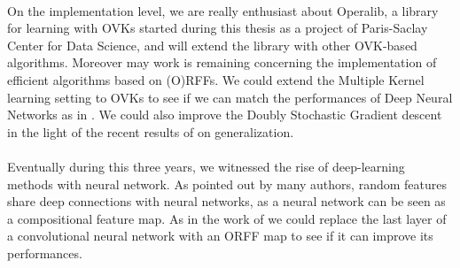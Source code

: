 \paragraph{}
On the implementation level, we are really enthusiast about Operalib, a
library for learning with \aclp{OVK} started during this thesis as a project of
Paris-Saclay Center for Data Science, and will extend the library with other
\acs{OVK}-based algorithms. Moreover may work is remaining concerning the
implementation of efficient algorithms based on (O)\acsp{RFF}. We could extend
the Multiple Kernel learning setting to \acsp{OVK} to see if we can match the
performances of Deep Neural Networks as in \citet{lu2014scale}.
We could also improve the Doubly Stochastic Gradient descent in the light of
the recent results of \citet{rudi2016generalization} on generalization.
\paragraph{}
Eventually during this three years, we witnessed the rise of deep-learning
methods with neural network. As pointed out by many authors, random features
share deep connections with neural networks, as a neural network can be seen as
a compositional feature map. As in the work of \citet{yang2015deep} we could
replace the last layer of a convolutional neural network
\citep{lecun1995convolutional} with an \acs{ORFF} map to see if it can improve
its performances.

\chapterend
